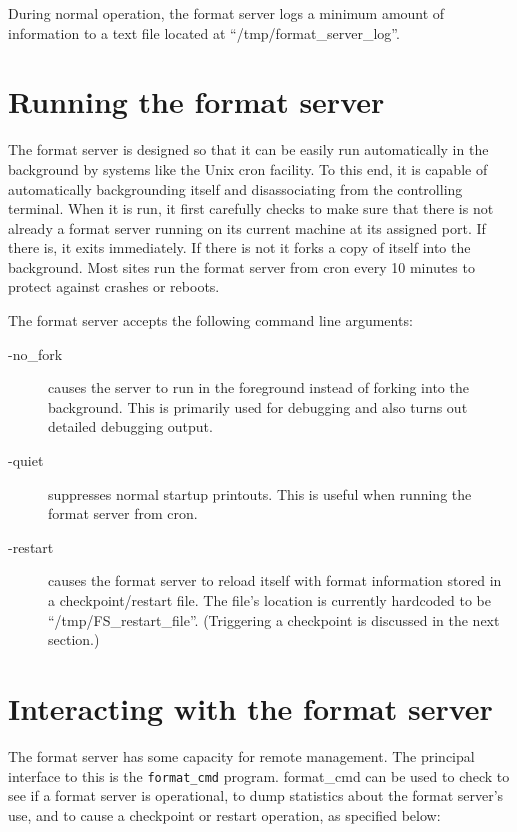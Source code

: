 \documentclass{article}
\begin{document}
During normal operation, the format server logs a minimum amount of
information to a text file located at ``/tmp/format\_server\_log''.

\section{Running the format server}

The format server is designed so that it can be easily run automatically
in the background by systems like the Unix cron facility.  To this end, it
is capable of automatically backgrounding itself and disassociating from the
controlling terminal.  When it is run, it first carefully checks to make
sure that there is not already a format server running on its current
machine at its assigned port.   If there is, it exits immediately.  If there
is not it forks a copy of itself into the background.  Most sites run the
format server from cron every 10 minutes to protect against crashes or
reboots. 

The format server accepts the following command line arguments:
\begin{description}
\item[-no\_fork] causes the server to run in the foreground instead of
forking into the background.  This is primarily used for debugging and also
turns out detailed debugging output.
\item[-quiet] suppresses normal startup printouts.  This is useful when
running the format server from cron.
\item[-restart] causes the format server to reload itself with format
information stored in a checkpoint/restart file.  The file's location is
currently hardcoded to be ``/tmp/FS\_restart\_file''.  (Triggering a
checkpoint is discussed in the next section.)
\end{description}
\section{Interacting with the format server}
The format server has some capacity for remote management.  The principal
interface to this is the {\tt format\_cmd} program.  format\_cmd can be used
to check to see if a format server is operational, to dump statistics about
the format server's use, and to cause a checkpoint or restart operation, as
specified below:
\end{document}
